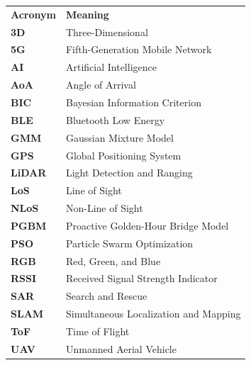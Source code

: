 \listoffigures  %

\listoftables  %

\clearpage  %


\begin{tabular}{p{3cm} p{10.5cm}}
    \textbf{Acronym} & \textbf{Meaning} \\[0.2cm]

    \textbf{3D}     & Three-Dimensional \\

    \textbf{5G}     & Fifth-Generation Mobile Network \\

    \textbf{AI}     & Artificial Intelligence \\

    \textbf{AoA}    & Angle of Arrival \\

    \textbf{BIC}    & Bayesian Information Criterion \\

    \textbf{BLE}    & Bluetooth Low Energy \\

    \textbf{GMM}    & Gaussian Mixture Model \\

    \textbf{GPS}    & Global Positioning System \\

    \textbf{LiDAR}  & Light Detection and Ranging \\

    \textbf{LoS}    & Line of Sight \\

    \textbf{NLoS}   & Non-Line of Sight \\

    \textbf{PGBM}   & Proactive Golden-Hour Bridge Model \\

    \textbf{PSO}    & Particle Swarm Optimization \\

    \textbf{RGB}    & Red, Green, and Blue \\

    \textbf{RSSI}   & Received Signal Strength Indicator \\

    \textbf{SAR}    & Search and Rescue \\

    \textbf{SLAM}   & Simultaneous Localization and Mapping \\

    \textbf{ToF}    & Time of Flight \\

    \textbf{UAV}    & Unmanned Aerial Vehicle \\

\end{tabular}
